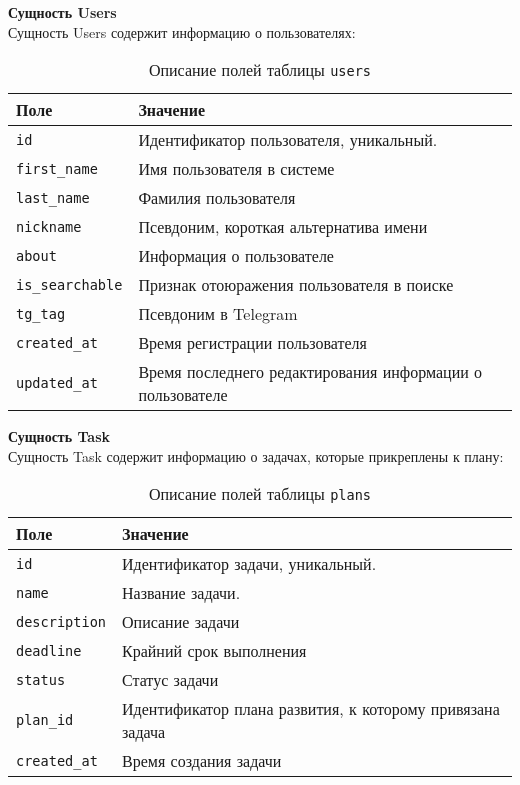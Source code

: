 \newpage
\noindent\textbf{Сущность Users}\\
Сущность Users содержит информацию о пользователях:
\begin{table}[!ht]
    \caption{Описание полей таблицы \texttt{users}}
    \label{tbl:users}
    \begin{center}
        \begin{tabular}{|p{}p{}|}
            \hline
            \textbf{Поле} & \textbf{Значение} \\\hline
            \texttt{id} & Идентификатор пользователя, уникальный. \\\hline
            \texttt{first\_name} & Имя пользователя в системе\\\hline
            \texttt{last\_name} & Фамилия пользователя \\\hline
            \texttt{nickname} & Псевдоним, короткая альтернатива имени \\\hline
            \texttt{about} & Информация о пользователе \\\hline
            \texttt{is\_searchable} & Признак отоюражения пользователя в поиске \\\hline
            \texttt{tg\_tag} & Псевдоним в Telegram \\\hline
            \texttt{created\_at} & Время регистрации пользователя\\\hline
            \texttt{updated\_at} & Время последнего редактирования информации о пользователе \\\hline
        \end{tabular}
    \end{center}
\end{table}

\noindent\textbf{Сущность Task}\\
Сущность Task содержит информацию о задачах, которые прикреплены к плану:
\begin{table}[!ht]
    \caption{Описание полей таблицы \texttt{plans}}
    \label{tbl:task}
    \begin{center}
        \begin{tabular}{|p{}p{}|}
            \hline
            \textbf{Поле} & \textbf{Значение} \\\hline
            \texttt{id} & Идентификатор задачи, уникальный. \\\hline
            \texttt{name} & Название задачи. \\\hline
            \texttt{description} & Описание задачи \\\hline
            \texttt{deadline} & Крайний срок выполнения \\\hline
            \texttt{status} & Статус задачи \\\hline
            \texttt{plan\_id} & Идентификатор плана развития, к которому привязана задача \\\hline
            \texttt{created\_at} & Время создания задачи\\\hline
        \end{tabular}
    \end{center}
\end{table}


